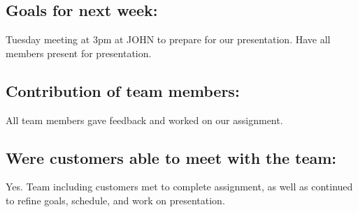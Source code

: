 \documentclass[12pt]{article}
\begin{document}
\subsection{Goals for next week:}
Tuesday meeting at 3pm at JOHN to prepare for our presentation. Have all members present for presentation. 

\subsection{Contribution of team members:}
All team members gave feedback and worked on our assignment.

\subsection{Were customers able to meet with the team:}
Yes. Team including customers met to complete assignment, as well as continued to refine goals, schedule, and work on presentation. 
\end{document}
